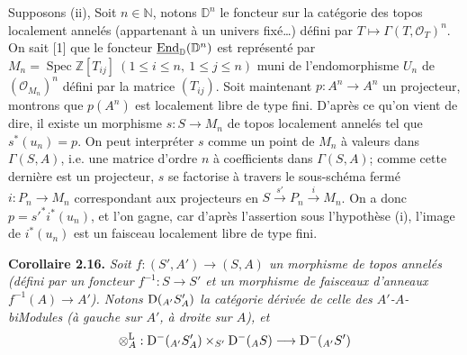 \documentclass[11pt]{article}
\newcommand{\Spec}{\operatorname{Spec}}
\begin{document}
Supposons (ii), Soit \(n\in\mathbb N\), notons \(\mathbb D^n\) le foncteur sur la catégorie des topos localement annelés (appartenant à un univers fixé\dots) défini par \(T\longmapsto\Gamma(T,\mathcal O_T)^n\). On sait [1] que le foncteur \(\underline{\operatorname{End}}_{\mathbb D}(\mathbb D^n)\) est représenté par \(M_n=\Spec\mathbb Z[T_{ij}]\ (1\leq i\leq n,\ 1\leq j\leq n)\) muni de l'endomorphisme \(U_n\) de \((\mathcal O_{M_n})^n\) défini par la matrice \((T_{ij})\). Soit maintenant \(p:A^n\longrightarrow A^n\) un projecteur, montrons que \(p(A^n)\) est localement libre de type fini. D'après ce qu'on vient de dire, il existe un morphisme \(s:S\longrightarrow M_n\) de topos localement annelés tel que \(s^*(u_n)=p\). On peut interpréter \(s\) comme un point de \(M_n\) à valeurs dans \(\Gamma(S,A)\), i.e. une matrice d'ordre \(n\) à coefficients dans \(\Gamma(S,A)\); comme cette dernière est un projecteur, \(s\) se factorise à travers le sous-schéma fermé \(i:P_n\to M_n\) correspondant aux projecteurs en \(S\xrightarrow{s'}P_n\xrightarrow{i}M_n\). On a donc \(p=s'^*i^*(u_n)\), et l'on gagne, car d'après l'assertion sous l'hypothèse (i), l'image de \(i^*(u_n)\) est un faisceau localement libre de type fini.

\textbf{Corollaire 2.16.} \emph{Soit \(f:(S',A')\to(S,A)\) un morphisme de topos annelés (défini par un foncteur \(f^{-1}:S\to S'\) et un morphisme de faisceaux d'anneaux \(f^{-1}(A)\to A'\)). Notons \(\mathrm D({}_{A'}S'_A)\) la catégorie dérivée de celle des \(A'\)-\(A\)-biModules (à gauche sur \(A'\), à droite sur \(A\)), et}
\[
  \otimes_A^{\mathrm L}:\mathrm D^-(_{A'}S'_A)\times_{S'}\mathrm D^-(_A S)
  \longrightarrow \mathrm D^-(_{A'}S')
\]
\end{document}
